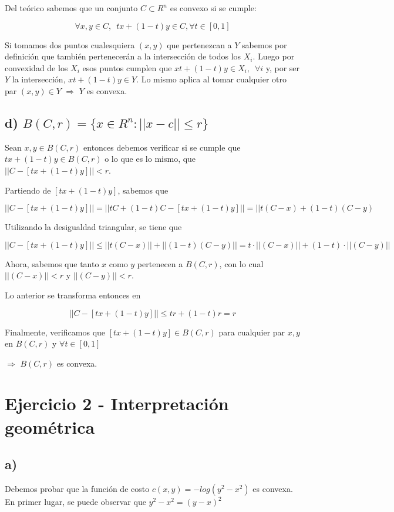 \documentclass[10pt,a4paper]{report}
\begin{document}
	Del teórico sabemos que un conjunto $C \subset R^n$ es convexo si se cumple:
	
	$$\forall x,y \in C,\hspace{6pt} tx + (1-t)y \in C, \forall t \in [0,1]$$
	
	Si tomamos dos puntos cualesquiera $(x,y)$ que pertenezcan a $Y$ sabemos por definición que también pertenecerán a la intersección de todos los $X_i$. Luego por convexidad de los $X_i$ esos puntos cumplen que $xt + (1-t)y \in X_i, \hspace{6pt} \forall i$ y, por ser $Y$ la intersección, $xt + (1-t)y \in Y$. Lo mismo aplica al tomar cualquier otro par $(x,y)\in Y$ $\Rightarrow$ $Y$ es convexa. 
	
	\subsection*{d) $ B(C,r) = \{x \in R^n : ||x-c|| \leq r\} $}
	
	Sean $x,y \in B(C,r)$ entonces debemos verificar si se cumple que $tx + (1-t)y \in B(C,r)$ o lo que es lo mismo, que 
	$||C - [tx + (1-t)y]|| < r$. 
	
	Partiendo de $[tx + (1-t)y]$, sabemos que
	
	$$||C - [tx + (1-t)y]|| = ||tC + (1-t)C - [tx + (1-t)y]|| = || t(C - x) + (1-t) (C - y) $$
	
	Utilizando la desigualdad triangular, se tiene que 
	
	$$||C - [tx + (1-t)y]|| \leq ||t(C-x)|| + ||(1-t)(C-y)|| = t\cdot||(C-x)|| + (1-t)\cdot||(C-y)||$$
	
	Ahora, sabemos que tanto $x$ como $y$ pertenecen a $B(C,r)$, con lo cual $||(C-x)|| < r$ y $||(C-y)|| < r$.
	
	Lo anterior se transforma entonces en
	
	$$||C - [tx + (1-t)y]|| \leq tr + (1-t)r = r$$
	
	Finalmente, verificamos que $[tx + (1-t)y] \in B(C,r)$ para cualquier par $x,y$ en $B(C,r)$ y $\forall t \in [0,1]$ 
	
	$\Rightarrow$ $B(C,r)$ es convexa.
	
	\section*{Ejercicio 2 - Interpretación geométrica}
	
	\subsection*{a) }
	
	Debemos probar que la función de costo $c(x,y) = -log(y^2 - x^2)$ es convexa. \\
	
	En primer lugar, se puede observar que $y^2 - x^2 = (y-x)^2$
	
	
\end{document}
